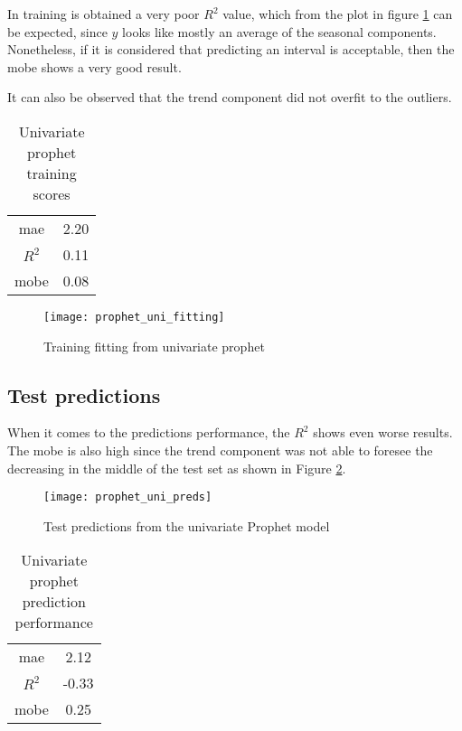 In training is obtained a very poor $R^2$ value, which from the plot in figure \ref{fig:prophet_uni_fitting} can be expected, since $\hat{y}$ looks like mostly an average of the seasonal components. Nonetheless, if it is considered that predicting an interval is acceptable, then the \ac{mobe} shows a very good result. 

It can also be observed that the trend component did not overfit to the outliers.

\begin{table}[H]
	\centering
	\begin{tabular}{|c|c|}
		\hline
		\ac{mae} 	& 2.20 \\
		$R^2$ 		& 0.11 \\
		\ac{mobe} 	& 0.08 \\
		\hline
	\end{tabular}
	\caption{Univariate prophet training scores}
	\label{table:prophet_uni_train_scores}
\end{table}

\begin{figure}[H]
	\centering
	\texttt{[image: prophet\_uni\_fitting]}
	\caption{Training fitting from univariate prophet}
	\label{fig:prophet_uni_fitting}
\end{figure}


\subsection{Test predictions}

When it comes to the predictions performance, the $R^2$ shows even worse results. The \ac{mobe} is also high since the trend component was not able to foresee the decreasing in the middle of the test set as shown in Figure \ref{fig:prophet_uni_preds}. 

\begin{figure}[H]
	\centering
	\texttt{[image: prophet\_uni\_preds]}
	\caption{Test predictions from the univariate Prophet model}
	\label{fig:prophet_uni_preds}
\end{figure}

\begin{table}[H]
	\centering
	\begin{tabular}{|c|c|}
		\hline
		\ac{mae} 	& 2.12 \\
		$R^2$ 		& -0.33 \\
		\ac{mobe} 	& 0.25 \\
		\hline
	\end{tabular}
	\caption{Univariate prophet prediction performance}
	\label{table:prophet_uni_test_scores}
\end{table}

